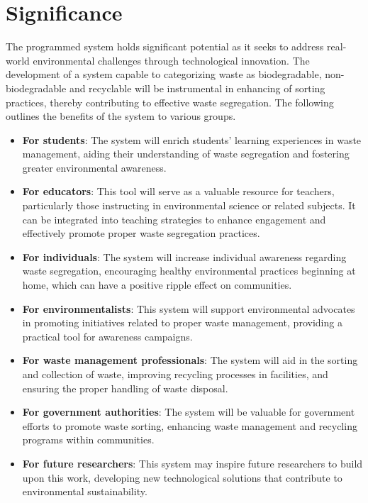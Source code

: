 \section{Significance}
	The programmed system holds significant potential as it seeks to address real-world environmental challenges through technological innovation. The development of a system capable to categorizing waste as biodegradable, non-biodegradable and recyclable will be instrumental in enhancing of sorting practices, thereby contributing to effective waste segregation. The following outlines the benefits of the system to various groups.
	
\begin{itemize}
	\item \textbf{For students}: The system will enrich students' learning experiences in waste management, aiding their understanding of waste segregation and fostering greater environmental awareness.
	
	\item \textbf{For educators}: This tool will serve as a valuable resource for teachers, particularly those instructing in environmental science or related subjects. It can be integrated into teaching strategies to enhance engagement and effectively promote proper waste segregation practices.
	
	\item \textbf{For individuals}: The system will increase individual awareness regarding waste segregation, encouraging healthy environmental practices beginning at home, which can have a positive ripple effect on communities.
	
	\item \textbf{For environmentalists}: This system will support environmental advocates in promoting initiatives related to proper waste management, providing a practical tool for awareness campaigns.
	
	\item \textbf{For waste management professionals}: The system will aid in the sorting and collection of waste, improving recycling processes in facilities, and ensuring the proper handling of waste disposal.
	
	\item \textbf{For government authorities}: The system will be valuable for government efforts to promote waste sorting, enhancing waste management and recycling programs within communities.
	
	\item \textbf{For future researchers}: This system may inspire future researchers to build upon this work, developing new technological solutions that contribute to environmental sustainability.
\end{itemize}
	